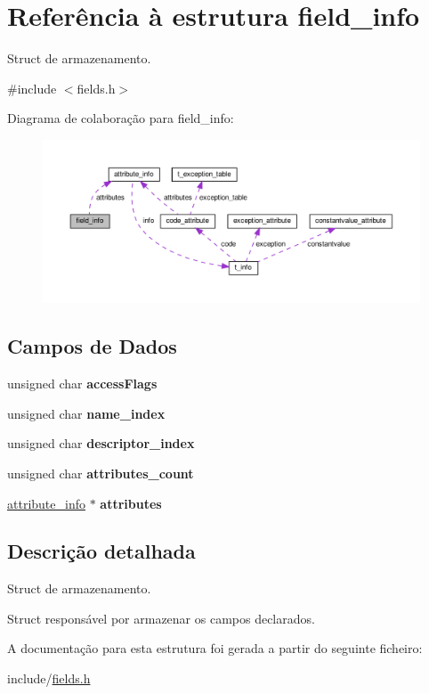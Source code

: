 \hypertarget{structfield__info}{}\section{Referência à estrutura field\+\_\+info}
\label{structfield__info}


Struct de armazenamento.  




{\ttfamily \#include $<$fields.\+h$>$}



Diagrama de colaboração para field\+\_\+info\+:\nopagebreak
\begin{figure}[H]
\begin{center}
\leavevmode
\includegraphics[width=350pt]{structfield__info__coll__graph}
\end{center}
\end{figure}
\subsection*{Campos de Dados}
\begin{DoxyCompactItemize}
\item 
\mbox{\label{structfield__info_a52647ac149308d5ef9f010689400ee4c}} 
unsigned char {\bfseries access\+Flags}
\item 
\mbox{\label{structfield__info_abb3389c726c0efe891c2d26567ecea49}} 
unsigned char {\bfseries name\+\_\+index}
\item 
\mbox{\label{structfield__info_afe39e4e9e594dfce15635923ad7d1f06}} 
unsigned char {\bfseries descriptor\+\_\+index}
\item 
\mbox{\label{structfield__info_a89ea1703d384244c336899c3b04850f9}} 
unsigned char {\bfseries attributes\+\_\+count}
\item 
\mbox{\label{structfield__info_afdda114944ae5eaae78c237f99257108}} 
\hyperlink{structattribute__info}{attribute\+\_\+info} $\ast$ {\bfseries attributes}
\end{DoxyCompactItemize}


\subsection{Descrição detalhada}
Struct de armazenamento. 

Struct responsável por armazenar os campos declarados. 

A documentação para esta estrutura foi gerada a partir do seguinte ficheiro\+:\begin{DoxyCompactItemize}
\item 
include/\hyperlink{fields_8h}{fields.\+h}\end{DoxyCompactItemize}
